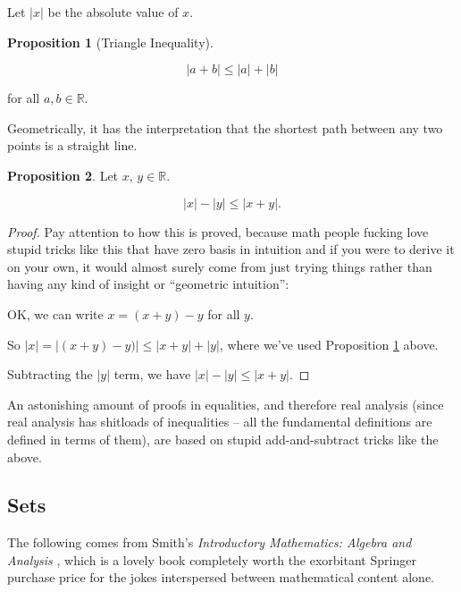 \documentclass{article}
\theoremstyle{definition}
\newtheorem{proposition}{Proposition}[section]
\begin{document}
Let $|x|$ be the absolute value of $x$.

\begin{proposition}[Triangle Inequality] \label{triangle-inequality}

\begin{equation*} 
|a + b| \leq |a| + |b| 
\end{equation*}

for all $a, b \in \mathbb{R}$.

\end{proposition}

Geometrically, it has the interpretation that the shortest path between any two points is a straight line.

\begin{proposition}
Let $x$, $y \in \mathbb{R}$.

\begin{equation*}
|x| - |y| \leq |x + y|.
\end{equation*}
\end{proposition}

\begin{proof}
Pay attention to how this is proved, because math people fucking love stupid tricks like this that have zero basis in intuition and if you were to derive it on your own, it would almost surely come from just trying things rather than having any kind of insight or ``geometric intuition'':

OK, we can write $x = (x + y) - y$ for all $y$.

So $|x| = | (x+y) - y) | \leq |x + y| + |y|$, where we've used Proposition \ref{triangle-inequality} above.

Subtracting the $|y|$ term, we have $|x| - |y| \leq |x + y|$.
\end{proof}

An astonishing amount of proofs in equalities, and therefore real analysis (since real analysis has shitloads of inequalities -- all the fundamental definitions are defined in terms of them), are based on stupid add-and-subtract tricks like the above.

\subsection{Sets}

The following comes from Smith's \textit{Introductory Mathematics: Algebra and Analysis} \cite{smith}, which is a lovely book completely worth the exorbitant Springer purchase price for the jokes interspersed between mathematical content alone.
\end{document}
